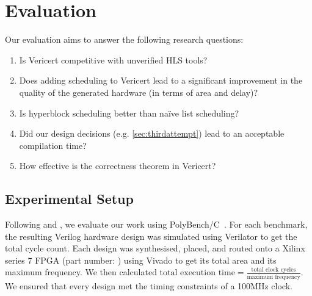 \graphicspath{{./figures/5-hyperblock-scheduling/}}

\chapter{Evaluation}%
\label{sec:evaluation}%
\label{sec:performance-comparison}

Our evaluation aims to answer the following research questions:

\begin{enumerate}[label=\textbf{RQ\arabic*}]
\item Is Vericert competitive with unverified HLS tools?
\item Does adding scheduling to Vericert lead to a significant improvement in
  the quality of the generated hardware (in terms of area and delay)?
\item Is hyperblock scheduling better than na\"ive list scheduling?
\item Did our design decisions (e.g. \cref{sec:thirdattempt}) lead to an
  acceptable compilation time?
\item How effective is the correctness theorem in Vericert?
\end{enumerate}

\section{Experimental Setup}

Following \textcite{herklotz21_fvhls} and
\textcite{six22_formal_verif_super_sched}, we evaluate our work using
PolyBench/C~\cite{pouchet20_polyb_c}. For each benchmark, the resulting Verilog
hardware design was simulated using Verilator to get the total cycle count. Each
design was synthesised, placed, and routed onto a Xilinx series 7 FPGA (part
number: ) using Vivado to get its total area and its
maximum frequency.  We then calculated
$\text{total execution time} = \frac{\text{total clock cycles}}{\text{maximum
    frequency}}$.  We ensured that every design met the timing constraints of a
100MHz clock.



